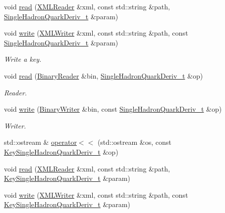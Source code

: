 \begin{DoxyCompactItemize}
void \mbox{\hyperlink{namespaceHadron_a0b9e3ade4af9d7765000d9cd6477956e}{read}} (\mbox{\hyperlink{classADATXML_1_1XMLReader}{X\+M\+L\+Reader}} \&xml, const std\+::string \&path, \mbox{\hyperlink{structHadron_1_1SingleHadronQuarkDeriv__t}{Single\+Hadron\+Quark\+Deriv\+\_\+t}} \&param)
\item 
void \mbox{\hyperlink{namespaceHadron_a2e0c9a892aa8790addf90c28db1eaf28}{write}} (\mbox{\hyperlink{classADATXML_1_1XMLWriter}{X\+M\+L\+Writer}} \&xml, const std\+::string \&path, const \mbox{\hyperlink{structHadron_1_1SingleHadronQuarkDeriv__t}{Single\+Hadron\+Quark\+Deriv\+\_\+t}} \&param)
\begin{DoxyCompactList}\small\item\em Write a key. \end{DoxyCompactList}\item 
void \mbox{\hyperlink{namespaceHadron_ad5dee2ca1e22f01bd860ef607035e36f}{read}} (\mbox{\hyperlink{classADATIO_1_1BinaryReader}{Binary\+Reader}} \&bin, \mbox{\hyperlink{structHadron_1_1SingleHadronQuarkDeriv__t}{Single\+Hadron\+Quark\+Deriv\+\_\+t}} \&op)
\begin{DoxyCompactList}\small\item\em Reader. \end{DoxyCompactList}\item 
void \mbox{\hyperlink{namespaceHadron_aca06b6220f81ed284c829138c237b84e}{write}} (\mbox{\hyperlink{classADATIO_1_1BinaryWriter}{Binary\+Writer}} \&bin, const \mbox{\hyperlink{structHadron_1_1SingleHadronQuarkDeriv__t}{Single\+Hadron\+Quark\+Deriv\+\_\+t}} \&op)
\begin{DoxyCompactList}\small\item\em Writer. \end{DoxyCompactList}\item 
std\+::ostream \& \mbox{\hyperlink{namespaceHadron_a4875d0c001c7eed8b1cb2f65a5e9fb6f}{operator$<$$<$}} (std\+::ostream \&os, const \mbox{\hyperlink{structHadron_1_1KeySingleHadronQuarkDeriv__t}{Key\+Single\+Hadron\+Quark\+Deriv\+\_\+t}} \&op)
\item 
void \mbox{\hyperlink{namespaceHadron_a41f47831ad3fb4b08af916cdee176a33}{read}} (\mbox{\hyperlink{classADATXML_1_1XMLReader}{X\+M\+L\+Reader}} \&xml, const std\+::string \&path, \mbox{\hyperlink{structHadron_1_1KeySingleHadronQuarkDeriv__t}{Key\+Single\+Hadron\+Quark\+Deriv\+\_\+t}} \&param)
\item 
void \mbox{\hyperlink{namespaceHadron_ad598d89ca80f65de661af491b2ee51e2}{write}} (\mbox{\hyperlink{classADATXML_1_1XMLWriter}{X\+M\+L\+Writer}} \&xml, const std\+::string \&path, const \mbox{\hyperlink{structHadron_1_1KeySingleHadronQuarkDeriv__t}{Key\+Single\+Hadron\+Quark\+Deriv\+\_\+t}} \&param)

\end{DoxyCompactItemize}
